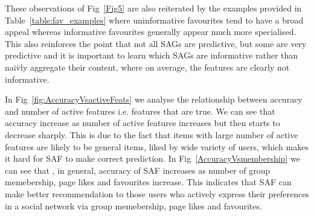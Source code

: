     These observations of Fig~\ref{Fig5} are also reiterated by the
    examples provided in Table~\ref{table:fav_examples} where uninformative favourites
    tend to have a broad appeal whereas informative favourites generally appear much
    more specialised.  This also reinforces the point that not all SAGs are predictive,
    but some are very predictive and it is important to learn which SAGs are informative
    rather than nai\"{v}ly aggregate their content, where on average, the features are
    clearly not informative.
   
    In Fig~\ref{fig:AccuracyVsactiveFeats} we analyse the relationship
    between accuracy and number of active features i.e. features that
    are true. We can see that accuracy increase as number of active
    features increases but then starts to decrease sharply. This is
    due to the fact that items with large number of active features
    are likely to be general items, liked by wide variety of users,
    which makes it hard for SAF to make correct prediction. In
    Fig~\ref{AccuracyVsmembership} we can see that , in general,
    accuracy of SAF increases as number of group memebership, page
    likes and favourites increase.  This indicates that SAF can make
    better recommendation to those users who actively express their
    preferences in a social network via group memebership, page likes
    and favourites.
    

%


